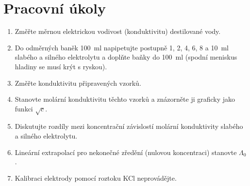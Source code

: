 \documentclass[a4paper]{article}
\author{Vladislav Wohlrath}
\begin{document}
\begin{titlepage}
%
\end{titlepage}

\section*{Pracovní úkoly}
\begin{enumerate}
\item Změřte měrnou elektrickou vodivost (konduktivitu) destilované vody.
\item Do odměrných baněk \SI{100}{\milli\litre} napipetujte postupně 1, 2, 4, 6, 8 a \SI{10}{\milli\litre} slabého a silného elektrolytu a doplňte baňky do \SI{100}{\milli\litre} (spodní meniskus hladiny se musí krýt s ryskou).
\item Změřte konduktivitu připravených vzorků.
\item Stanovte molární konduktivitu těchto vzorků a znázorněte ji graficky jako funkci $\sqrt{c}$.
\item Diskutujte rozdíly mezi koncentrační závislostí molární konduktivity slabého a silného elektrolytu.
\item Lineární extrapolací pro nekonečné zředění (nulovou koncentraci) stanovte $\Lambda_0$.
\item Kalibraci elektrody pomocí roztoku KCl neprovádějte.
\end{enumerate}










\printbibliography[title={Seznam použité literatury}]
\end{document}
